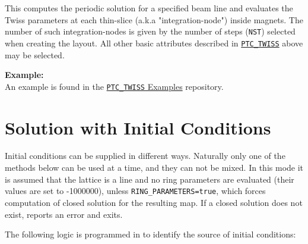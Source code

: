 This computes the periodic solution for a specified beam
line and evaluates the Twiss parameters at each thin-slice
(a.k.a "integration-node") inside magnets. The number of such
integration-nodes is given by the number of steps (\texttt{NST})
selected when creating the \ptc layout. All other basic
attributes described in \hyperref[sec:ptc-twiss]{\texttt{PTC\_TWISS}}
above may be selected.



\textbf{Example:} \\
An example is found in the
\href{http://madx.web.cern.ch/madx/madX/examples/ptc_twiss/SliceMagnets/}
{\texttt{PTC\_TWISS} Examples} repository. 



\section{Solution with Initial Conditions}
\label{sec:ptc-twiss-sol-initial-cond}


Initial conditions can be supplied in different ways.  Naturally only
one of the methods below can be used at a time, and they can not be
mixed.  In this mode it is assumed that the lattice is a line and no
ring parameters are evaluated (their values are set to -1000000), unless
\texttt{RING\_PARAMETERS=true}, which forces computation of closed solution
for the resulting map. If a closed solution does not exist, \ptc
reports an error and exits.

The following logic is programmed in \ptc to identify the source of
initial conditions: 



